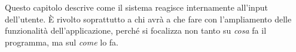 Questo capitolo descrive come il sistema reagisce internamente all'input dell'utente. È rivolto soprattutto a chi avrà a che fare con l'ampliamento delle funzionalità dell'applicazione, perché si focalizza non tanto su \emph{cosa} fa il programma, ma sul \emph{come} lo fa.
